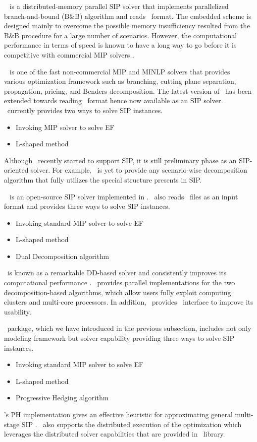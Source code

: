 \pipssbb\ \cite{web:PIPS-SBB} is a distributed-memory parallel SIP solver that implements parallelized branch-and-bound (B\&B) algorithm and reads \smps\ format. The embedded scheme is designed mainly to overcome the possible memory insufficiency resulted from the B\&B procedure for a large number of scenarios. However, the computational performance in terms of speed is known to have a long way to go before it is competitive with commercial MIP solvers \cite{proceeding:MOR2016}.

\scip\ \cite{SCIP} is one of the fast non-commercial MIP and MINLP solvers that provides various optimization framework such as branching, cutting plane separation, propagation, pricing, and Benders decomposition. The latest version of \scip\ has been extended towards reading \smps\ format hence now available as an SIP solver. \scip\ currently provides two ways to solve SIP instances.
\begin{itemize}
	\item Invoking MIP solver to solve EF
	\item L-shaped method
\end{itemize}
Although \scip\ recently started to support SIP, it is still preliminary phase as an SIP-oriented solver. For example, \scip\ is yet to provide any scenario-wise decomposition algorithm that fully utilizes the special structure presents in SIP.

\dsp\ \cite{web:DSP} is an open-source SIP solver implemented in \cpp. \dsp\ also reads \smps\ files as an input format and provides three ways to solve SIP instances.
\begin{itemize}
	\item Invoking standard MIP solver to solve EF
	\item L-shaped method
	\item Dual Decomposition algorithm
\end{itemize}
\dsp\ is known as a remarkable DD-based solver and consistently improves its computational performance \cite{journal:KZ2015}. \dsp\ provides parallel implementations for the two decomposition-based algorithms, which allow users fully exploit computing clusters and multi-core processors. In addition, \dsp\ provides \julia\ interface to improve its usability.

\pysp\ package, which we have introduced in the previous subsection, includes not only modeling framework but solver capability providing three ways to solve SIP instances. 
\begin{itemize}
	\item Invoking standard MIP solver to solve EF
	\item L-shaped method
	\item Progressive Hedging algorithm
\end{itemize}
\pysp's PH implementation gives an effective heuristic for approximating general multi-stage SIP \cite{journal:WWH2012}. \pysp\ also supports the distributed execution of the optimization which leverages the distributed solver capabilities that are provided in \pyomo\ library.

